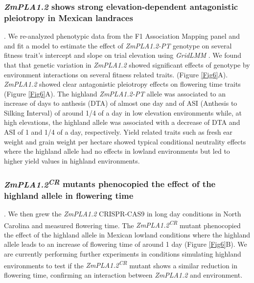 \documentclass[9pt,twocolumn,twoside,lineno]{BioRxiv}
\begin{document}
\subsubsection{\textit{ZmPLA1.2} shows strong elevation-dependent antagonistic pleiotropy in Mexican landraces}. 
We re-analyzed phenotypic data from the F1 Association Mapping panel \cite{Romero_Navarro2017-cn} and \cite{Gates2019-xu} and fit a model to estimate the effect of \textit{ZmPLA1.2-PT} genotype on several fitness trait's intercept and slope on trial elevation using \textit{GridLMM} \cite{Runcie2019-Gr}. 
We found that that genetic variation in \textit{ZmPLA1.2} showed significant effects of genotype by environment interactions on several fitness related traits. (Figure \ref{Fig6}A). 
\textit{ZmPLA1.2} showed clear antagonistic pleiotropy effects on flowering time traits (Figure \ref{Fig6}A). 
The highland \textit{ZmPLA1.2-PT} allele was associated to an increase of days to anthesis (DTA) of almost one day and of ASI (Anthesis to Silking Interval) of around 1/4 of a day in low elevation environments while, at high elevations, the highland allele was associated with a decrease of DTA and ASI of 1 and 1/4 of a day, respectively.
Yield related traits such as fresh ear weight and grain weight per hectare showed typical conditional neutrality effects where the highland allele had no effects in lowland environments but led to higher yield values in highland environments.
\subsubsection{\textit{ZmPLA1.2\textsuperscript{CR}} mutants phenocopied the effect of the highland allele in flowering time}.
We then grew the \textit{ZmPLA1.2} CRISPR-CAS9 in long day conditions in North Carolina and measured flowering time. 
The \textit{ZmPLA1.2\textsuperscript{CR}} mutant phenocopied the effect of the highland allele in Mexican lowland conditions where the highland allele leads to an increase of flowering time of around 1 day (Figure \ref{Fig6}B). 
We are currently performing further experiments in conditions simulating highland environments to test if the \textit{ZmPLA1.2\textsuperscript{CR}} mutant shows a similar reduction in flowering time, confirming an interaction between \textit{ZmPLA1.2} and environment.
\end{document}
